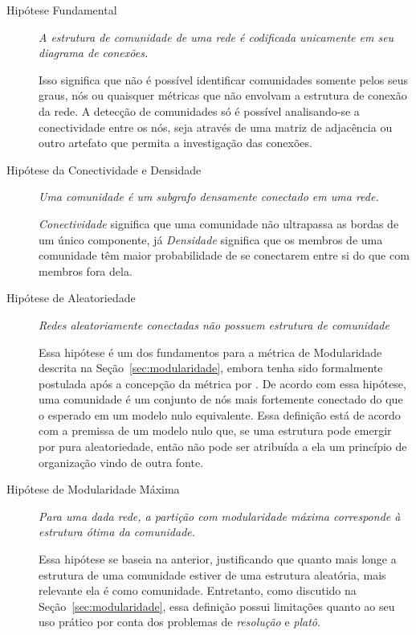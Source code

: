 \documentclass[12pt,a4paper]{article}
\theoremstyle{hypo}
\begin{document}
\begin{description}
\item [Hipótese Fundamental] \textit{A estrutura de comunidade de uma rede é codificada unicamente em seu diagrama de conexões.}

Isso significa que não é possível identificar comunidades somente pelos seus graus, nós ou quaisquer métricas que não envolvam a estrutura de conexão da rede. A detecção de comunidades só é possível analisando-se a conectividade entre os nós, seja através de uma matriz de adjacência ou outro artefato que permita a investigação das conexões.

\item [Hipótese da Conectividade e Densidade] \textit{Uma comunidade é um subgrafo densamente conectado em uma rede.}

\textit{Conectividade} significa que uma comunidade não ultrapassa as bordas de um único componente, já \textit{Densidade} significa que os membros de uma comunidade têm maior probabilidade de se conectarem entre si do que com membros fora dela.

\item [Hipótese de Aleatoriedade] \textit{Redes aleatoriamente conectadas não possuem estrutura de comunidade}

Essa hipótese é um dos fundamentos para a métrica de Modularidade descrita na Seção~\ref{sec:modularidade}, embora tenha sido formalmente postulada após a concepção da métrica por . De acordo com essa hipótese, uma comunidade é um conjunto de nós mais fortemente conectado do que o esperado em um modelo nulo equivalente. Essa definição está de acordo com a premissa de um modelo nulo que, se uma estrutura pode emergir por pura aleatoriedade, então não pode ser atribuída a ela um princípio de organização vindo de outra fonte.

\item [Hipótese de Modularidade Máxima] \textit{Para uma dada rede, a partição com modularidade máxima corresponde à estrutura ótima da comunidade.}

Essa hipótese se baseia na anterior, justificando que quanto mais longe a estrutura de uma comunidade estiver de uma estrutura aleatória, mais relevante ela é como comunidade. Entretanto, como discutido na Seção~\ref{sec:modularidade}, essa definição possui limitações quanto ao seu uso prático por conta dos problemas de \textit{resolução} e \textit{platô}.

\end{description}
\end{document}

